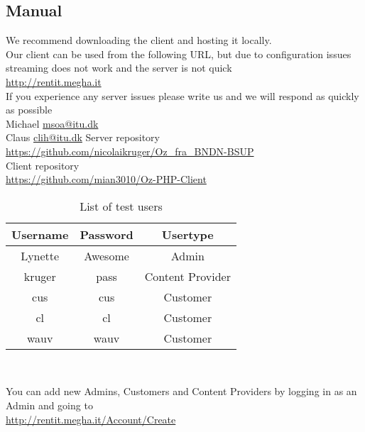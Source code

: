 \subsection{Manual}
We recommend downloading the client and hosting it locally.
\\\newline Our client can be used from the following URL, but due to configuration issues streaming does not work and the server is not quick
\\\url{http://rentit.megha.it}
\\\newline If you experience any server issues please write us and we will respond as quickly as possible
\\Michael \url{msoa@itu.dk}
\\Claus \url{clih@itu.dk}
Server repository
\\\url{https://github.com/nicolaikruger/Oz_fra_BNDN-BSUP}
\\Client repository
\\\url{https://github.com/mian3010/Oz-PHP-Client}
\begin{table}[H]
\centering
\begin{tabular}{|c|c|c|}
\hline
Username & Password & Usertype \\\hline\hline
Lynette & Awesome & Admin \\\hline
kruger & pass & Content Provider \\\hline
cus & cus & Customer \\\hline
cl & cl & Customer \\\hline
wauv & wauv & Customer \\\hline
\end{tabular}\\
\caption{List of test users}
\end{table}
You can add new Admins, Customers and Content Providers by logging in as an Admin and going to
\\\url{http://rentit.megha.it/Account/Create}
\newpage